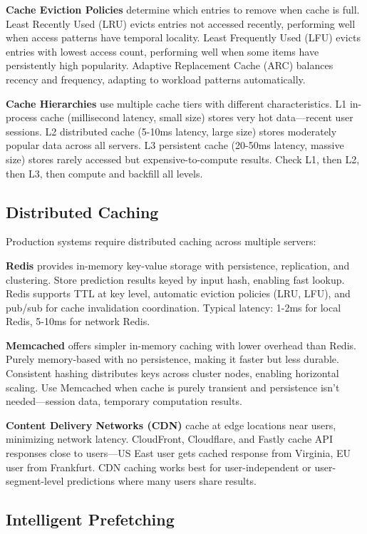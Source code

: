 \textbf{Cache Eviction Policies} determine which entries to remove when cache is full. Least Recently Used (LRU) evicts entries not accessed recently, performing well when access patterns have temporal locality. Least Frequently Used (LFU) evicts entries with lowest access count, performing well when some items have persistently high popularity. Adaptive Replacement Cache (ARC) balances recency and frequency, adapting to workload patterns automatically.

\textbf{Cache Hierarchies} use multiple cache tiers with different characteristics. L1 in-process cache (millisecond latency, small size) stores very hot data---recent user sessions. L2 distributed cache (5-10ms latency, large size) stores moderately popular data across all servers. L3 persistent cache (20-50ms latency, massive size) stores rarely accessed but expensive-to-compute results. Check L1, then L2, then L3, then compute and backfill all levels.

\subsection{Distributed Caching}

Production systems require distributed caching across multiple servers:

\textbf{Redis} provides in-memory key-value storage with persistence, replication, and clustering. Store prediction results keyed by input hash, enabling fast lookup. Redis supports TTL at key level, automatic eviction policies (LRU, LFU), and pub/sub for cache invalidation coordination. Typical latency: 1-2ms for local Redis, 5-10ms for network Redis.

\textbf{Memcached} offers simpler in-memory caching with lower overhead than Redis. Purely memory-based with no persistence, making it faster but less durable. Consistent hashing distributes keys across cluster nodes, enabling horizontal scaling. Use Memcached when cache is purely transient and persistence isn't needed---session data, temporary computation results.

\textbf{Content Delivery Networks (CDN)} cache at edge locations near users, minimizing network latency. CloudFront, Cloudflare, and Fastly cache API responses close to users---US East user gets cached response from Virginia, EU user from Frankfurt. CDN caching works best for user-independent or user-segment-level predictions where many users share results.

\subsection{Intelligent Prefetching}

